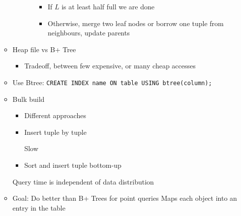 \begin{itemize}
\begin{itemize}
\begin{itemize}
\begin{itemize}
\begin{itemize}
                                    \item If $L$ is at least half full we are done
                                    \item Otherwise, merge two leaf nodes or borrow one tuple from neighbours, update parents
                                \end{itemize}
                        \end{itemize}
                \end{itemize}
            \item Heap file vs B+ Tree
                \begin{itemize}
                        \begin{itemize}
                            \ipro Lot of sequential scans
                        \end{itemize}
                        \begin{itemize}
                            \ipro Small number of random access
                        \end{itemize}
                    \item Tradeoff, between few expensive, or many cheap accesses
                \end{itemize}
            \item Use Btree: \verb+CREATE INDEX name ON table USING btree(column);+
            \item Bulk build
                \begin{itemize}
                    \item Different approaches
                    \item Insert tuple by tuple
                        \begin{itemize}
                            \icon Slow
                        \end{itemize}
                    \item Sort and insert tuple bottom-up
                \end{itemize}
            \ipro Query time is independent of data distribution
        \end{itemize}
        \begin{itemize}
            \item Goal: Do better than B+ Trees for point queries
             Maps each object into an entry in the table
                \begin{itemize}

\end{itemize}
\end{itemize}
\end{itemize}
